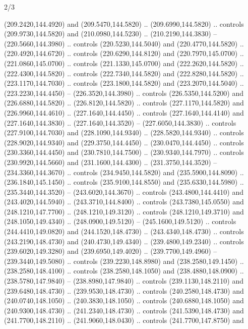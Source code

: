 \begin{flagdescription}{2/3}
\begin{scope}[xshift=0.5\flaglength,yshift=0.5\flagwidth,scale=\flagwidth/259.2]
\begin{scope}[y=0.8pt, x=0.8pt, yscale=-1,shift={(-243,-162)}]
      (209.2420,144.4920) and (209.5470,144.5820) .. (209.6990,144.5820) .. controls
      (209.9730,144.5820) and (210.0980,144.5230) .. (210.2190,144.3830) --
      (220.5660,144.3980) .. controls (220.5230,144.5040) and (220.4770,144.5820) ..
      (220.4920,144.6720) .. controls (220.6290,144.8120) and (220.7970,145.0700) ..
      (221.0860,145.0700) .. controls (221.1330,145.0700) and (222.2620,144.5820) ..
      (222.4300,144.5820) .. controls (222.7340,144.5820) and (222.8280,144.5820) ..
      (223.1170,144.7030) .. controls (223.1800,144.5820) and (223.2070,144.5040) ..
      (223.2230,144.4450) -- (226.3520,144.3980) .. controls (226.5350,144.5200) and
      (226.6880,144.5820) .. (226.8120,144.5820) .. controls (227.1170,144.5820) and
      (226.9960,144.4610) .. (227.1640,144.4450) .. controls (227.1640,144.4140) and
      (227.1640,144.3830) .. (227.1640,144.3520) -- (227.6050,144.3830) .. controls
      (227.9100,144.7030) and (228.1090,144.9340) .. (228.5820,144.9340) .. controls
      (228.9020,144.9340) and (229.3750,144.4450) .. (230.0470,144.4450) .. controls
      (230.3360,144.4450) and (230.7810,144.7500) .. (230.9340,144.7970) .. controls
      (230.9920,144.5660) and (231.1600,144.4300) .. (231.3750,144.3520) --
      (234.3360,144.3670) .. controls (234.9450,144.5820) and (235.5900,144.8090) ..
      (236.1840,145.1450) .. controls (235.9100,144.8550) and (235.6330,144.5980) ..
      (235.3440,144.3520) -- (243.6020,144.3670) .. controls (243.4800,144.4410) and
      (243.4020,144.5940) .. (243.3710,144.8400) .. controls (243.7380,145.0550) and
      (248.1210,147.7700) .. (248.1210,149.3120) .. controls (248.1210,149.3710) and
      (248.1050,149.4340) .. (248.0900,149.5120) -- (245.1600,149.5120) .. controls
      (244.4410,149.0820) and (244.1520,148.4730) .. (243.4340,148.4730) .. controls
      (243.2190,148.4730) and (240.4730,149.4340) .. (239.4800,149.2340) .. controls
      (239.6020,149.3280) and (239.6950,149.4020) .. (239.7700,149.4960) --
      (239.3440,149.5080) .. controls (239.2230,148.8980) and (238.2580,149.1450) ..
      (238.2580,148.4100) .. controls (238.2580,148.1050) and (238.4880,148.0900) ..
      (238.5780,147.9840) -- (238.8980,147.9840) .. controls (239.1130,148.2110) and
      (239.6480,148.4730) .. (239.9530,148.4730) .. controls (240.2580,148.4730) and
      (240.0740,148.1050) .. (240.3830,148.1050) .. controls (240.6880,148.1050) and
      (240.9300,148.4730) .. (241.2340,148.4730) .. controls (241.5390,148.4730) and
      (241.7700,148.2110) .. (241.9060,148.0430) .. controls (241.7700,147.8750) and

\end{scope}
\end{scope}
\end{flagdescription}
